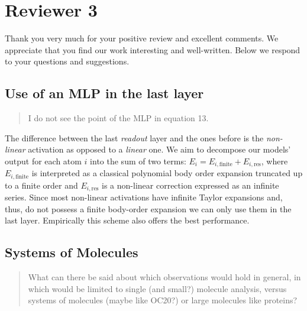 \documentclass{article}
\begin{document}
\section{Reviewer 3}

Thank you very much for your positive review and excellent comments. 
We appreciate that you find our work interesting and well-written.
Below we respond to your questions and suggestions.

\subsection*{Use of an MLP in the last layer}

\begin{quote}
    I do not see the point of the MLP in equation 13.
\end{quote}

The difference between the last \textit{readout} layer and the ones before is the \textit{non-linear} activation as opposed to a \textit{linear} one.
We aim to decompose our models' output for each atom $i$ into the sum of two terms:
$E_{i} = E_{i,\text{finite}} + E_{i,\text{res}}$, 
where
$E_{i,\text{finite}}$ is interpreted as a classical polynomial body order expansion truncated up to a finite order and $ E_{i,\text{res}}$ is a non-linear correction expressed as an infinite series.
Since most non-linear activations have infinite Taylor expansions and, thus, do not possess a finite body-order expansion we can only use them in the last layer.
Empirically this scheme also offers the best performance.


\subsection*{Systems of Molecules}


\begin{quote}
    What can there be said about which observations would hold in general, in which would be limited to single (and small?) molecule analysis, versus systems of molecules (maybe like OC20?) or large molecules like proteins?
\end{quote}
\end{document}
